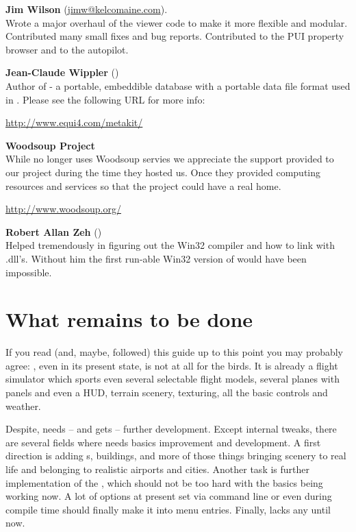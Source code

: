\noindent \textbf{Jim Wilson}
(\href{jimw@kelcomaine.com}{jimw@kelcomaine.com}).\\
 Wrote a major overhaul of the viewer code to make it more flexible and modular. Contributed many small fixes and bug reports. Contributed to the PUI property browser and to the autopilot.
 \medskip

 \noindent \textbf{Jean-Claude Wippler}
 ()\\
  Author of  - a portable, embeddible database with a portable
  data file format used in \FlightGear{}. Please see the following URL for more info:
 \medskip

  \href{http://www.equi4.com/metakit/}{http://www.equi4.com/metakit/}
  \medskip

\noindent \textbf{Woodsoup Project}\\

  While \FlightGear{} no longer uses Woodsoup servies we appreciate the
  support provided to our project during the time they hosted us. Once they
  provided computing resources and services so that the \FlightGear{} project
  could have a real home.

\href{http://www.woodsoup.org/}{http://www.woodsoup.org/}
  \medskip

\noindent \textbf{Robert Allan Zeh} ()\\
  Helped tremendously in figuring out the  Win32 compiler and
  how to link with .dll's.  Without him the first run-able Win32
  version of \FlightGear{} would have been impossible.

\section{What remains to be done}

If you read (and, maybe, followed) this guide up to this point you may probably agree: \FlightGear{}$\!$, even in its present state, is not at all for the birds. It is
already a flight simulator which sports even several selectable flight models, several planes with panels and even a HUD, terrain scenery, texturing, all the basic controls and weather.

Despite, \FlightGear{} needs -- and gets -- further development. Except internal tweaks,
there are several fields where \FlightGear{} needs basics improvement and development. A
first direction is adding s, buildings, and more of those things bringing
scenery to real life and belonging to realistic airports and cities. Another task is further
implementation of the , which should not be too hard with the basics
being working now. A lot of options at present set via command line or even during
compile time should finally make it into menu entries. Finally, \FlightGear{} lacks any
 until now. 

